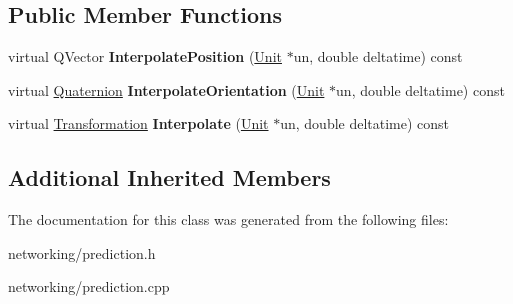 \subsection*{Public Member Functions}
\begin{DoxyCompactItemize}
\item 
virtual Q\+Vector {\bfseries Interpolate\+Position} (\hyperlink{classUnit}{Unit} $\ast$un, double deltatime) const \hypertarget{classLinearPrediction_a2601f51e3a14ad1a1b1d794ecc45eea2}{}\label{classLinearPrediction_a2601f51e3a14ad1a1b1d794ecc45eea2}

\item 
virtual \hyperlink{structQuaternion}{Quaternion} {\bfseries Interpolate\+Orientation} (\hyperlink{classUnit}{Unit} $\ast$un, double deltatime) const \hypertarget{classLinearPrediction_affb01e5e8f1cec931e8c357ae1a029ee}{}\label{classLinearPrediction_affb01e5e8f1cec931e8c357ae1a029ee}

\item 
virtual \hyperlink{structTransformation}{Transformation} {\bfseries Interpolate} (\hyperlink{classUnit}{Unit} $\ast$un, double deltatime) const \hypertarget{classLinearPrediction_a3e326ef2dea68c5a0b78fd505d9b8469}{}\label{classLinearPrediction_a3e326ef2dea68c5a0b78fd505d9b8469}

\end{DoxyCompactItemize}
\subsection*{Additional Inherited Members}


The documentation for this class was generated from the following files\+:\begin{DoxyCompactItemize}
\item 
networking/prediction.\+h\item 
networking/prediction.\+cpp\end{DoxyCompactItemize}
